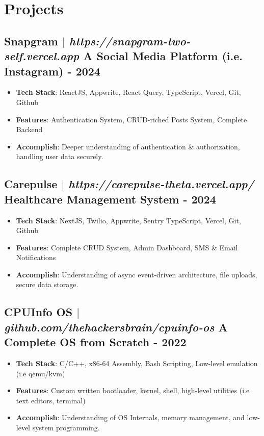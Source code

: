 \documentclass[11pt]{article}
\begin{document}
\section{Projects}
\subsection{Snapgram $|$ \normalfont\textit{https://snapgram-two-self.vercel.app} \hfill A Social Media Platform (i.e. Instagram) - \textbf{2024}}
\vspace{3pt}
\begin{itemize}
  \item \textbf{Tech Stack}: ReactJS, Appwrite, React Query, TypeScript, Vercel, Git, Github
  \item \textbf{Features}: Authentication System, CRUD-riched Posts System, Complete Backend
  \item \textbf{Accomplish}: Deeper understanding of authentication \& authorization, handling user data securely.
\end{itemize}

\subsection{Carepulse $|$ \normalfont\textit{https://carepulse-theta.vercel.app/} \hfill Healthcare Management System - \textbf{2024}}
\vspace{3pt}
\begin{itemize}
  \item \textbf{Tech Stack}: NextJS, Twilio, Appwrite, Sentry TypeScript, Vercel, Git, Github
  \item \textbf{Features}: Complete CRUD System, Admin Dashboard, SMS \& Email Notifications
  \item \textbf{Accomplish}: Understanding of async event-driven architecture, file uploads, secure data storage.
\end{itemize}

\subsection{CPUInfo OS $|$ \normalfont\textit{github.com/thehackersbrain/cpuinfo-os} \hfill A Complete OS from Scratch - \textbf{2022}}
\vspace{3pt}
\begin{itemize}
  \item \textbf{Tech Stack}: C/C++, x86-64 Assembly, Bash Scripting, Low-level emulation (i.e qemu/kvm)
  \item \textbf{Features}: Custom written bootloader, kernel, shell, high-level utilities (i.e text editors, terminal)
  \item \textbf{Accomplish}: Understanding of OS Internals, memory management, and low-level system programming.
\end{itemize}
\end{document}
